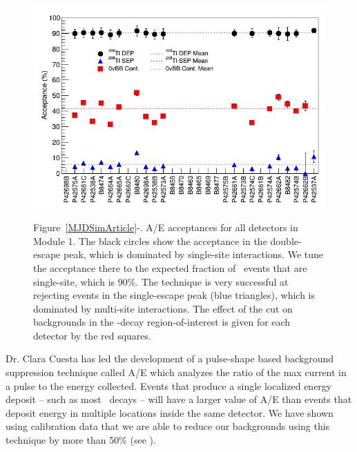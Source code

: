 \begin{figure}
\begin{center}
\hfil  \includegraphics[width=.48\textwidth]{DS1_AoverECut_Efficiency_160330.png} \hfil 

\end{center}
 \hfil \parbox{.5\textwidth}{\small Figure~\ref{MJDSimArticle}-. A/E acceptances for all detectors in Module 1. The black circles show the acceptance in the  double-escape peak, which is dominated by single-site interactions. We tune the acceptance there to the expected fraction of \nonubb\ events that are single-site, which is 90\%. The technique is very successful at rejecting events in the  single-escape peak (blue triangles), which is dominated by multi-site interactions. The effect of the cut on backgrounds in the  \nonubb-decay region-of-interest is given for each detector by the red squares. }  \hfil

\label{AoE}  %

\end{figure}

\indent Dr. Clara Cuesta has led the development of a pulse-shape based background suppression technique called A/E which analyzes the ratio of the max current in a pulse to the energy collected. Events that produce a single localized energy deposit \--- such as most \nonubb\ decays \--- will have a larger value of A/E than events that deposit energy in multiple locations inside the same detector. We have shown using  calibration data that we are able to reduce our backgrounds using this technique by more than 50\% (see ).

